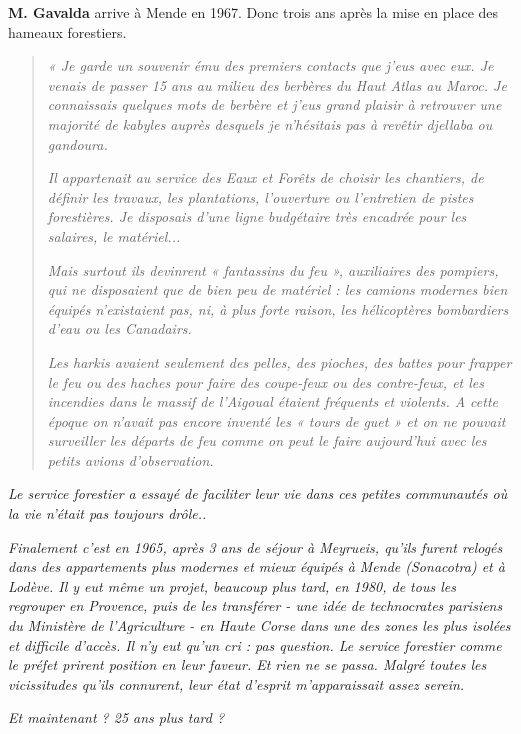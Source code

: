 \textbf{M. Gavalda} arrive à Mende en 1967. Donc trois ans après la mise en place des
hameaux forestiers.

\begin{quote}
\textit{« Je garde un souvenir ému des premiers contacts que j’eus avec eux. Je venais de
passer 15 ans au milieu des berbères du Haut Atlas au Maroc. Je connaissais
quelques mots de berbère et j’eus grand plaisir à retrouver une majorité de kabyles
auprès desquels je n’hésitais pas à revêtir djellaba ou gandoura.}

\textit{Il appartenait au service des Eaux et Forêts de choisir les chantiers, de définir les
travaux, les plantations, l’ouverture ou l’entretien de pistes forestières. Je disposais
d’une ligne budgétaire très encadrée pour les salaires, le matériel...}

\textit{Mais surtout ils devinrent « fantassins du feu », auxiliaires des pompiers, qui ne
disposaient que de bien peu de matériel : les camions modernes bien équipés
n’existaient pas, ni, à plus forte raison, les hélicoptères bombardiers d’eau ou les
Canadairs.}

\textit{Les harkis avaient seulement des pelles, des pioches, des battes pour frapper le feu
ou des haches pour faire des coupe-feux ou des contre-feux, et les incendies dans le
massif de l’Aigoual étaient fréquents et violents. A cette époque on n’avait pas
encore inventé les « tours de guet » et on ne pouvait surveiller les départs de feu
comme on peut le faire aujourd’hui avec les petits avions d’observation.}
\end{quote}

\textit{Le service forestier a essayé de faciliter leur vie dans ces petites communautés où la
vie n’était pas toujours drôle..}

\textit{Finalement c’est en 1965, après 3 ans de séjour à Meyrueis, qu’ils furent relogés
dans des appartements plus modernes et mieux équipés à Mende (Sonacotra) et à
Lodève.
Il y eut même un projet, beaucoup plus tard, en 1980, de tous les regrouper en
Provence, puis de les transférer - une idée de technocrates parisiens du Ministère
de l’Agriculture - en Haute Corse dans une des zones les plus isolées et difficile
d’accès. Il n’y eut qu’un cri : pas question. Le service forestier comme le préfet
prirent position en leur faveur. Et rien ne se passa. Malgré toutes les vicissitudes
qu’ils connurent, leur état d’esprit m’apparaissait assez serein.}

\textit{Et maintenant ? 25 ans plus tard ?}

